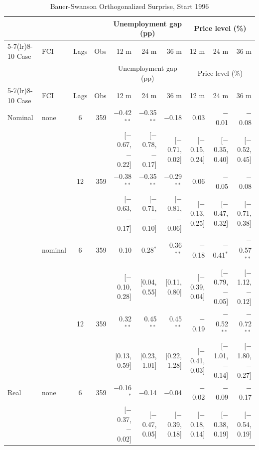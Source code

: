 \begingroup\scriptsize\setlength{\tabcolsep}{0.9pt}
\begin{longtable}{llcrrrrrrr}
\caption{Bauer-Swanson Orthogonalized Surprise, Start 1996}\label{tab:appR3}\\
\toprule
 & & & & \multicolumn{3}{c}{Unemployment gap (pp)} & \multicolumn{3}{c}{Price level (\%)}\\ \cmidrule(lr){5-7}\cmidrule(lr){8-10}
Case & FCI & Lags & Obs & 12 m & 24 m & 36 m & 12 m & 24 m & 36 m\\
\midrule\endfirsthead
\toprule
 & & & & \multicolumn{3}{c}{Unemployment gap (pp)} & \multicolumn{3}{c}{Price level (\%)}\\ \cmidrule(lr){5-7}\cmidrule(lr){8-10}
Case & FCI & Lags & Obs & 12 m & 24 m & 36 m & 12 m & 24 m & 36 m\\
\midrule\endhead
\bottomrule\endfoot
Nominal & none & 6 & 359 & $-$0.42$^{**}$ & $-$0.35$^{**}$ & $-$0.18 & 0.03 & $-$0.01 & $-$0.08\\
 & & & & {\scriptsize [$-$0.67, $-$0.22]} & {\scriptsize [$-$0.78, $-$0.17]} & {\scriptsize [$-$0.71, 0.02]} & {\scriptsize [$-$0.15, 0.24]} & {\scriptsize [$-$0.35, 0.40]} & {\scriptsize [$-$0.52, 0.45]}\\
 &  & 12 & 359 & $-$0.38$^{**}$ & $-$0.35$^{**}$ & $-$0.29$^{**}$ & 0.06 & $-$0.05 & $-$0.08\\
 & & & & {\scriptsize [$-$0.63, $-$0.17]} & {\scriptsize [$-$0.71, $-$0.10]} & {\scriptsize [$-$0.81, $-$0.06]} & {\scriptsize [$-$0.13, 0.25]} & {\scriptsize [$-$0.47, 0.32]} & {\scriptsize [$-$0.71, 0.38]}\\
 & nominal & 6 & 359 & 0.10 & 0.28$^{*}$ & 0.36$^{**}$ & $-$0.18 & $-$0.41$^{*}$ & $-$0.57$^{**}$\\
 & & & & {\scriptsize [$-$0.10, 0.28]} & {\scriptsize [0.04, 0.55]} & {\scriptsize [0.11, 0.80]} & {\scriptsize [$-$0.39, 0.04]} & {\scriptsize [$-$0.79, $-$0.05]} & {\scriptsize [$-$1.12, $-$0.12]}\\
 &  & 12 & 359 & 0.32$^{**}$ & 0.45$^{**}$ & 0.45$^{**}$ & $-$0.19 & $-$0.52$^{**}$ & $-$0.72$^{**}$\\
 & & & & {\scriptsize [0.13, 0.59]} & {\scriptsize [0.23, 1.01]} & {\scriptsize [0.22, 1.28]} & {\scriptsize [$-$0.41, 0.03]} & {\scriptsize [$-$1.01, $-$0.14]} & {\scriptsize [$-$1.80, $-$0.27]}\\
\addlinespace
Real & none & 6 & 359 & $-$0.16$^{*}$ & $-$0.14 & $-$0.04 & $-$0.02 & $-$0.09 & $-$0.17\\
 & & & & {\scriptsize [$-$0.37, $-$0.02]} & {\scriptsize [$-$0.47, 0.05]} & {\scriptsize [$-$0.39, 0.18]} & {\scriptsize [$-$0.18, 0.14]} & {\scriptsize [$-$0.38, 0.19]} & {\scriptsize [$-$0.54, 0.19]}\\

\end{longtable}
